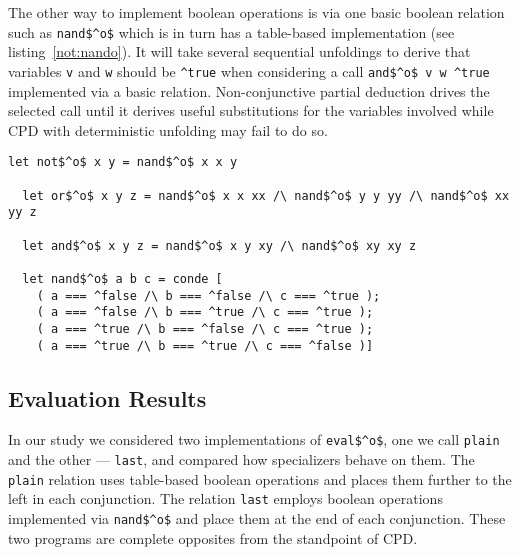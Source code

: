 The other way to implement boolean operations is via one basic boolean relation such as \lstinline{nand$^o$} which is in turn has a table-based implementation (see listing~\ref{not:nando}).
It will take several sequential unfoldings to derive that variables \lstinline{v} and \lstinline{w} should be \lstinline{^true} when considering a call \lstinline{and$^o$ v w ^true} implemented via a basic relation.
Non-conjunctive partial deduction drives the selected call until it derives useful substitutions for the variables involved while CPD with deterministic unfolding may fail to do so.

\begin{figure*}[!h]
  \centering
  \begin{minipage}{0.7\textwidth}
    \begin{lstlisting}[label={not:nando}, caption={Implementation of boolean operation via \lstinline{nand}}, captionpos=b, frame=tb]
  let not$^o$ x y = nand$^o$ x x y

  let or$^o$ x y z = nand$^o$ x x xx /\ nand$^o$ y y yy /\ nand$^o$ xx yy z

  let and$^o$ x y z = nand$^o$ x y xy /\ nand$^o$ xy xy z

  let nand$^o$ a b c = conde [
    ( a === ^false /\ b === ^false /\ c === ^true );
    ( a === ^false /\ b === ^true /\ c === ^true );
    ( a === ^true /\ b === ^false /\ c === ^true );
    ( a === ^true /\ b === ^true /\ c === ^false )]
    \end{lstlisting}
  \end{minipage}
\end{figure*}

\subsection{Evaluation Results}

In our study we considered two implementations of \lstinline{eval$^o$}, one we call \lstinline{plain} and the other --- \lstinline{last}, and compared how specializers behave on them.
The \lstinline{plain} relation uses table-based boolean operations and places them further to the left in each conjunction.
The relation \lstinline{last} employs boolean operations implemented via \lstinline{nand$^o$} and place them at the end of each conjunction.
These two programs are complete opposites from the standpoint of CPD.

